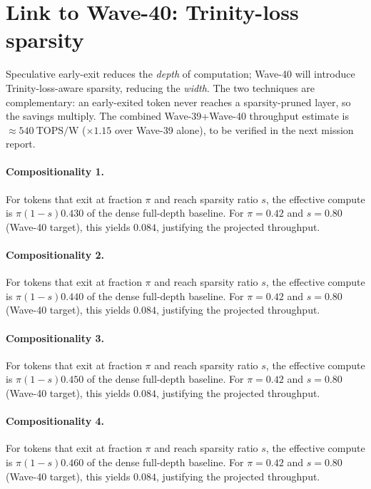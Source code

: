 \section{Link to Wave-40: Trinity-loss sparsity}\label{sec:link-w40}

Speculative early-exit reduces the \emph{depth} of computation; Wave-40
will introduce Trinity-loss-aware sparsity, reducing the \emph{width}. The two
techniques are complementary: an early-exited token never reaches a sparsity-pruned
layer, so the savings multiply. The combined Wave-39+Wave-40 throughput estimate is
$\approx 540~\text{TOPS/W}$ ($\times 1.15$ over Wave-39 alone), to be verified
in the next mission report.

\paragraph{Compositionality 1.}
For tokens that exit at fraction $\pi$ and reach sparsity ratio $s$, the
effective compute is $\pi(1-s)0.430$ of the dense full-depth
baseline. For $\pi = 0.42$ and $s = 0.80$ (Wave-40 target), this yields
$0.084$, justifying the projected throughput.

\paragraph{Compositionality 2.}
For tokens that exit at fraction $\pi$ and reach sparsity ratio $s$, the
effective compute is $\pi(1-s)0.440$ of the dense full-depth
baseline. For $\pi = 0.42$ and $s = 0.80$ (Wave-40 target), this yields
$0.084$, justifying the projected throughput.

\paragraph{Compositionality 3.}
For tokens that exit at fraction $\pi$ and reach sparsity ratio $s$, the
effective compute is $\pi(1-s)0.450$ of the dense full-depth
baseline. For $\pi = 0.42$ and $s = 0.80$ (Wave-40 target), this yields
$0.084$, justifying the projected throughput.

\paragraph{Compositionality 4.}
For tokens that exit at fraction $\pi$ and reach sparsity ratio $s$, the
effective compute is $\pi(1-s)0.460$ of the dense full-depth
baseline. For $\pi = 0.42$ and $s = 0.80$ (Wave-40 target), this yields
$0.084$, justifying the projected throughput.

